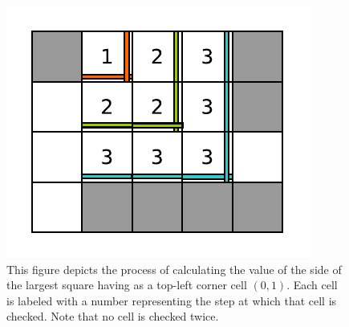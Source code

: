 \begin{figure}
	\centering
	\label{fig:square_in_matrix:square_matrix_diagonal}
	\includegraphics[]{sources/square_in_matrix/images/square_matrix_diagonal}
	\caption[Square in matrix - Brute-force diagonal]{This figure depicts the process of calculating the value of the side of the largest square having as a top-left corner cell $(0,1)$. Each cell is labeled with a number representing the step at which that cell is checked. Note that no cell is checked twice.}
\end{figure}





